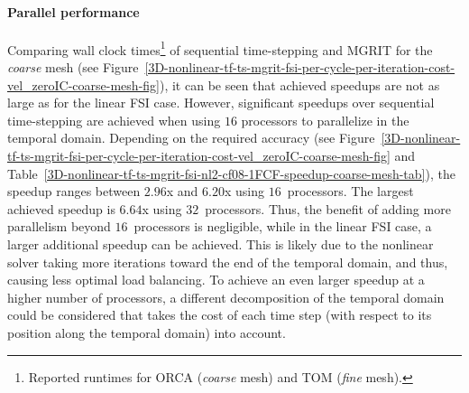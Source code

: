 \documentclass[3p]{elsarticle}
\begin{document}
\paragraph{Parallel performance}
Comparing wall clock times\footnote{Reported runtimes
for ORCA (\emph{coarse} mesh) and TOM (\emph{fine} mesh).}
of sequential time-stepping and MGRIT for the \emph{coarse} mesh
(see Figure~\ref{3D-nonlinear-tf-ts-mgrit-fsi-per-cycle-per-iteration-cost-vel_zeroIC-coarse-mesh-fig}),
it can be seen that achieved speedups are not as large as for the linear FSI case.
However, significant speedups over sequential time-stepping are achieved
when using $16$ processors to parallelize in the temporal domain.
Depending on the required accuracy
(see Figure~\ref{3D-nonlinear-tf-ts-mgrit-fsi-per-cycle-per-iteration-cost-vel_zeroIC-coarse-mesh-fig}
and Table~\ref{3D-nonlinear-tf-ts-mgrit-fsi-nl2-cf08-1FCF-speedup-coarse-mesh-tab}),
the speedup ranges between $2.96$x and $6.20$x using $16$~processors.
The largest achieved speedup is $6.64$x using $32$~processors.
Thus, the benefit of adding more parallelism beyond $16$~processors is negligible,
while in the linear FSI case, a larger additional speedup can be achieved.
This is likely due to the nonlinear solver taking more iterations toward the end of the temporal domain,
and thus, causing less optimal load balancing.
To achieve an even larger speedup at a higher number of processors, a different decomposition
of the temporal domain could be considered that takes the cost of each time step
(with respect to its position along the temporal domain) into account.
\end{document}

